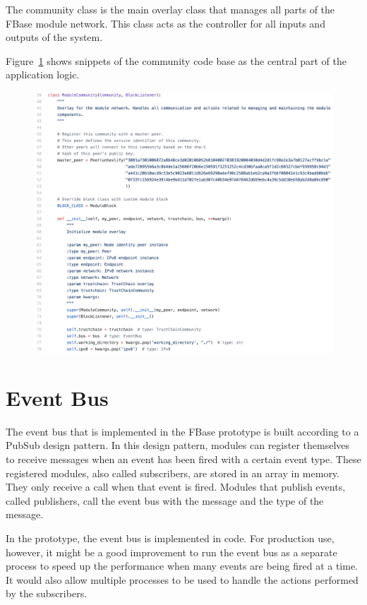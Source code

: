 The community class is the main overlay class that manages all parts of the FBase module network. This class acts as the controller for all inputs and outputs of the system.

Figure~\ref{fig:community-code} shows snippets of the community code base as the central part of the application logic.

\begin{figure}[h!]
	\centering
	\includegraphics[width=\textwidth]{images/code-community-class.png}
	\caption{\label{fig:community-code}}
\end{figure}

\section{Event Bus}

The event bus that is implemented in the FBase prototype is built according to a PubSub design pattern. In this design pattern, modules can register themselves to receive messages when an event has been fired with a certain event type. These registered modules, also called subscribers, are stored in an array in memory. They only receive a call when that event is fired. Modules that publish events, called publishers, call the event bus with the message and the type of the message.

In the prototype, the event bus is implemented in code. For production use, however, it might be a good improvement to run the event bus as a separate process to speed up the performance when many events are being fired at a time. It would also allow multiple processes to be used to handle the actions performed by the subscribers. 

